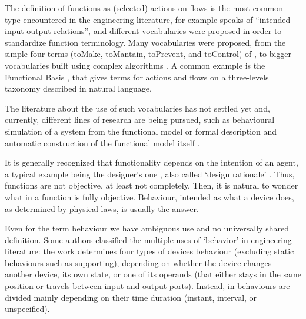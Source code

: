 \documentclass[crcready]{iosart2x}
\begin{document}
 The definition of functions as (selected) actions on flows is the most common type encountered in the engineering literature, for example \cite{chandrasekaranFunctionalRepresentationDesign1993} speaks of  ``intended input-output relations'', and different vocabularies were proposed in order to 
 standardize function terminology. Many vocabularies were proposed, from the simple four terms (toMake, toMantain, toPrevent, and toControl) of \cite{keuneke_device_1991}, 
 to bigger vocabularies built using complex algorithms \cite{kitamuraFunctionalConceptOntology2002a}. 
 A common example is the Functional Basis \cite{hirtz_functional_2002, stone_development_2000}, that gives terms for 
 actions and flows on a three-levels taxonomy described in natural language.

 The literature about the use of such vocabularies has not settled yet and, currently, different lines of research are being pursued, such as behavioural simulation of a system from the functional model \cite{kurtogluGraphBasedFaultIdentification2008} or 
 formal description and automatic construction of the 
 functional model itself \cite{gill_logic_2021,kurtoglu_automating_2010}.


It is generally recognized that functionality depends on the intention of an agent, a typical example being the designer's one \cite{kitamuraOntologyBasedFunctionalKnowledgeModeling2004}, also called `design rationale' \cite{chandrasekaranFunctionalRepresentationDesign1993}. 
Thus, functions are not objective, at least not completely. Then, it is natural to wonder what in a function is fully objective. Behaviour, intended as what a device does, as determined by physical laws, is usually the answer.    

Even for the term behaviour we have ambiguous use and no universally shared definition. Some authors classified the multiple uses of `behavior' in engineering literature: 
the work \cite{kitamuraOntologyBasedFunctionalKnowledgeModeling2004} determines four types of devices behaviour (excluding static behaviours such as supporting), depending on whether the device changes another device, its own state, or one of its operands (that either stays in the same position or travels between input and output ports).
Instead, in \cite{chandrasekaranFunctionDeviceRepresentation2000} behaviours are divided mainly depending on their time duration (instant, interval, or unspecified).
\end{document}
